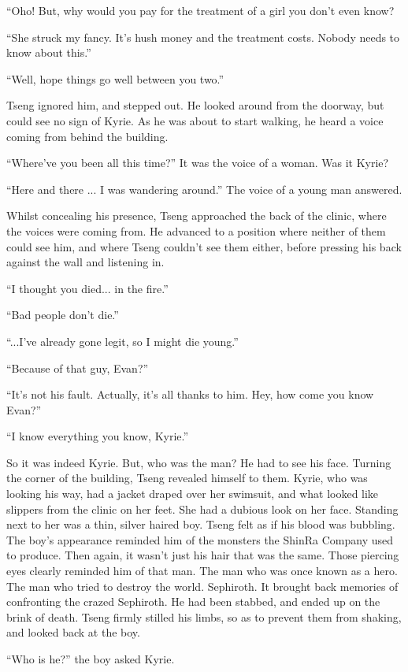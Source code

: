 \documentclass[oneside]{book}
\begin{document}
“Oho! But, why would you pay for the treatment of a girl you don’t even know?

“She struck my fancy. It’s hush money and the treatment costs. Nobody needs to know about this.”

“Well, hope things go well between you two.”

Tseng ignored him, and stepped out. He looked around from the doorway, but could see no sign of Kyrie. As he was about to start walking, he heard a voice coming from behind the building.

“Where’ve you been all this time?” It was the voice of a woman. Was it Kyrie?

“Here and there ... I was wandering around.” The voice of a young man answered.

Whilst concealing his presence, Tseng approached the back of the clinic, where the voices were coming from. He advanced to a position where neither of them could see him, and where Tseng couldn’t see them either, before pressing his back against the wall and listening in.

“I thought you died... in the fire.”

“Bad people don’t die.”

“...I’ve already gone legit, so I might die young.”

“Because of that guy, Evan?”

“It’s not his fault. Actually, it’s all thanks to him. Hey, how come you know Evan?”

“I know everything you know, Kyrie.”

So it was indeed Kyrie. But, who was the man? He had to see his face. Turning the corner of the building, Tseng revealed himself to them. Kyrie, who was looking his way, had a jacket draped over her swimsuit, and what looked like slippers from the clinic on her feet. She had a dubious look on her face. Standing next to her was a thin, silver haired boy. Tseng felt as if his blood was bubbling. The boy’s appearance reminded him of the monsters the ShinRa Company used to produce. Then again, it wasn’t just his hair that was the same. Those piercing eyes clearly reminded him of that man. The man who was once known as a hero. The man who tried to destroy the world. Sephiroth. It brought back memories of confronting the crazed Sephiroth. He had been stabbed, and ended up on the brink of death. Tseng firmly stilled his limbs, so as to prevent them from shaking, and looked back at the boy.

“Who is he?” the boy asked Kyrie.
\end{document}
